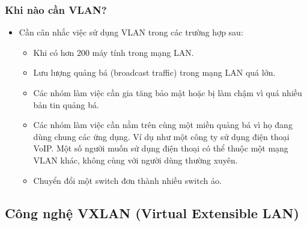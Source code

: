 \documentclass[13pt]{article}
\begin{document}
\subsubsection{Khi nào cần VLAN?}
\begin{itemize}
    \item Cần cân nhắc việc sử dụng VLAN trong các trường hợp sau:
    \begin{itemize}
        \item Khi có hơn 200 máy tính trong mạng LAN.
        \item Lưu lượng quảng bá (broadcast traffic) trong mạng LAN quá lớn.
        \item Các nhóm làm việc cần gia tăng bảo mật hoặc bị làm chậm vì quá nhiều bản tin quảng bá.
        \item Các nhóm làm việc cần nằm trên cùng một miền quảng bá vì họ đang dùng chung các ứng dụng. Ví dụ như một công ty sử dụng điện thoại VoIP. Một số người muốn sử dụng điện thoại có thể thuộc một mạng VLAN khác, không cùng với người dùng thường xuyên.
        \item Chuyển đổi một switch đơn thành nhiều switch ảo.
    \end{itemize}
\end{itemize}

\subsection{Công nghệ VXLAN (Virtual Extensible LAN)}
\end{document}

